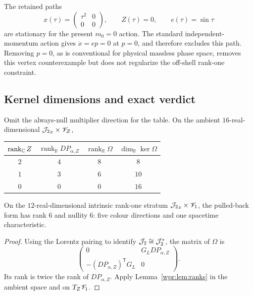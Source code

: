\begin{counterexample}
\label{wpr:ce:zero}
The retained paths
\[
 x(\tau)=\begin{pmatrix}\tau^2&0\\0&0\end{pmatrix},\qquad
 Z(\tau)=0,\qquad e(\tau)=\sin\tau
\]
are stationary for the present \(m_0=0\) action.  The standard
independent-momentum action gives \(\dot x=e p=0\) at \(p=0\), and
therefore excludes this path.  Removing \(p=0\), as is conventional
for physical massless phase space, removes this vertex counterexample
but does not regularize the off-shell rank-one constraint.
\end{counterexample}

\subsection{Kernel dimensions and exact verdict}
\begin{proposition}
\label{wpr:prop:kernels}
Omit the always-null multiplier direction for the table.  On the
ambient \(16\)-real-dimensional \({\mathcal J_2}_x\times{\mathscr V}_Z\),
\begin{center}
\begin{tabular}{c c c c}
\toprule
\(\operatorname{rank}_{\mathbb C} Z\)&\(\operatorname{rank}_{\mathbb R}D P_{\alpha,Z}\)&
\(\operatorname{rank}_{\mathbb R}\Omega\)&
\(\dim_{\mathbb R}\ker\Omega\)\\
\midrule
\(2\)&\(4\)&\(8\)&\(8\)\\
\(1\)&\(3\)&\(6\)&\(10\)\\
\(0\)&\(0\)&\(0\)&\(16\)\\
\bottomrule
\end{tabular}
\end{center}
On the \(12\)-real-dimensional intrinsic rank-one stratum
\({\mathcal J_2}_x\times{\mathscr V}_1\), the pulled-back form has rank \(6\) and nullity
\(6\): five colour directions and one spacetime characteristic.
\end{proposition}
\begin{proof}
Using the Lorentz pairing to identify \(\mathcal J_2\cong\mathcal J_2^*\), the matrix of
\(\Omega\) is
\[
 \begin{pmatrix}
 0&G_L D P_{\alpha,Z}\\
 -(D P_{\alpha,Z})^{\mathsf T}G_L&0
 \end{pmatrix}.
\]
Its rank is twice the rank of \(D P_{\alpha,Z}\).  Apply
Lemma~\ref{wpr:lem:ranks} in the ambient space and on \(T_Z{\mathscr V}_1\).
\end{proof}

